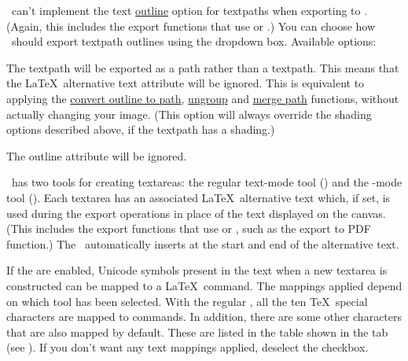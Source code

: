 
\FlowframTk\ can't implement the text
\hyperref[sec:textoutline]{outline} option for
\glspl{textpath} when exporting to . (Again, this
includes the export functions that use  or .)
You can choose how \FlowframTk\ should export \gls{textpath}
outlines using the 
dropdown box. Available options:

\begin{deflist}
\itemtitle
 {}

\begin{itemdesc}
The \gls{textpath} will be exported as a path rather than a
\gls{textpath}. This means that the \LaTeX\
alternative text attribute will be ignored. This is equivalent to
applying the
\hyperref[sec:outlinetopath]{convert outline to path}, 
\hyperref[sec:grouping]{ungroup} and 
\hyperref[sec:mergepaths]{merge path}
functions, without actually changing your image.
(This option will always override the shading options described
above, if the \gls{textpath} has a shading.)
\end{itemdesc}

\itemtitle
 {}

\begin{itemdesc}
The outline attribute will be ignored.
\end{itemdesc}

\end{deflist}

%
%
\FlowframTk\ has two tools for creating \glspl{textarea}: the
regular text-mode tool () and the
-mode tool (). Each \gls{textarea} has an
associated \LaTeX\ alternative text which, if set, is used
during the  export operations in place of the
text displayed on the \gls{canvas}. (This includes the export
functions that use  or , such as
the export to PDF function.) The \mathstool\ automatically
inserts  at the start and end of the
alternative text. 

If the  are enabled, Unicode symbols present in
the text when a new \gls*{textarea} is constructed can be mapped to
a \LaTeX\ command.
The mappings applied depend on which tool has been selected. With
the regular \texttool, all the ten \TeX\ special characters are
mapped to commands. In addition, there are some other characters
that are also mapped by default. These are listed in the table shown
in the \widget{textconfig.textmode} tab (see
). If you don't want any
text mappings applied, deselect the
 \gls{checkbox}.

